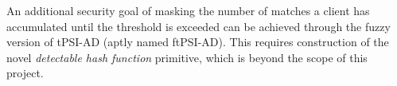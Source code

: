 An additional security goal of masking the number of matches a client has accumulated until the threshold is exceeded can be achieved through the fuzzy version of tPSI-AD (aptly named ftPSI-AD). This requires construction of the novel \emph{detectable hash function} primitive, which is beyond the scope of this project.